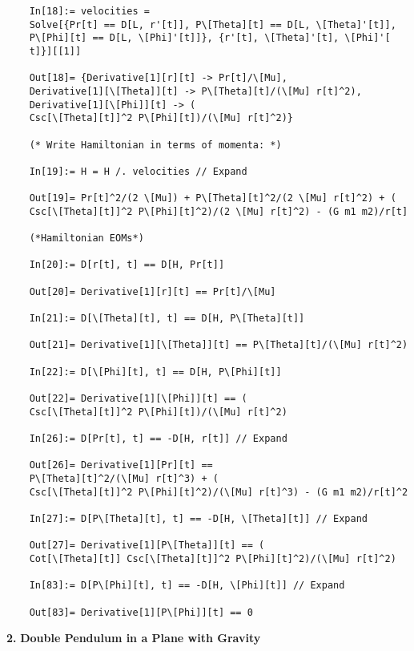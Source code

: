 \documentclass{article}
\theoremstyle{definition}
\begin{document}
\begin{enumerate}[label=(\alph*)]
\begin{lstlisting}
	In[18]:= velocities = 
	Solve[{Pr[t] == D[L, r'[t]], P\[Theta][t] == D[L, \[Theta]'[t]], 
	P\[Phi][t] == D[L, \[Phi]'[t]]}, {r'[t], \[Theta]'[t], \[Phi]'[
	t]}][[1]]
	
	Out[18]= {Derivative[1][r][t] -> Pr[t]/\[Mu], 
	Derivative[1][\[Theta]][t] -> P\[Theta][t]/(\[Mu] r[t]^2), 
	Derivative[1][\[Phi]][t] -> (
	Csc[\[Theta][t]]^2 P\[Phi][t])/(\[Mu] r[t]^2)}
	
	(* Write Hamiltonian in terms of momenta: *)
	
	In[19]:= H = H /. velocities // Expand
	
	Out[19]= Pr[t]^2/(2 \[Mu]) + P\[Theta][t]^2/(2 \[Mu] r[t]^2) + (
	Csc[\[Theta][t]]^2 P\[Phi][t]^2)/(2 \[Mu] r[t]^2) - (G m1 m2)/r[t]
	
	(*Hamiltonian EOMs*)
	
	In[20]:= D[r[t], t] == D[H, Pr[t]]
	
	Out[20]= Derivative[1][r][t] == Pr[t]/\[Mu]
	
	In[21]:= D[\[Theta][t], t] == D[H, P\[Theta][t]]
	
	Out[21]= Derivative[1][\[Theta]][t] == P\[Theta][t]/(\[Mu] r[t]^2)
	
	In[22]:= D[\[Phi][t], t] == D[H, P\[Phi][t]]
	
	Out[22]= Derivative[1][\[Phi]][t] == (
	Csc[\[Theta][t]]^2 P\[Phi][t])/(\[Mu] r[t]^2)
	
	In[26]:= D[Pr[t], t] == -D[H, r[t]] // Expand
	
	Out[26]= Derivative[1][Pr][t] == 
	P\[Theta][t]^2/(\[Mu] r[t]^3) + (
	Csc[\[Theta][t]]^2 P\[Phi][t]^2)/(\[Mu] r[t]^3) - (G m1 m2)/r[t]^2
	
	In[27]:= D[P\[Theta][t], t] == -D[H, \[Theta][t]] // Expand
	
	Out[27]= Derivative[1][P\[Theta]][t] == (
	Cot[\[Theta][t]] Csc[\[Theta][t]]^2 P\[Phi][t]^2)/(\[Mu] r[t]^2)
	
	In[83]:= D[P\[Phi][t], t] == -D[H, \[Phi][t]] // Expand
	
	Out[83]= Derivative[1][P\[Phi]][t] == 0
	\end{lstlisting}
	
\end{enumerate}







\newpage
\noindent \textbf{2.} \textbf{Double Pendulum in a Plane with Gravity}
\end{document}

